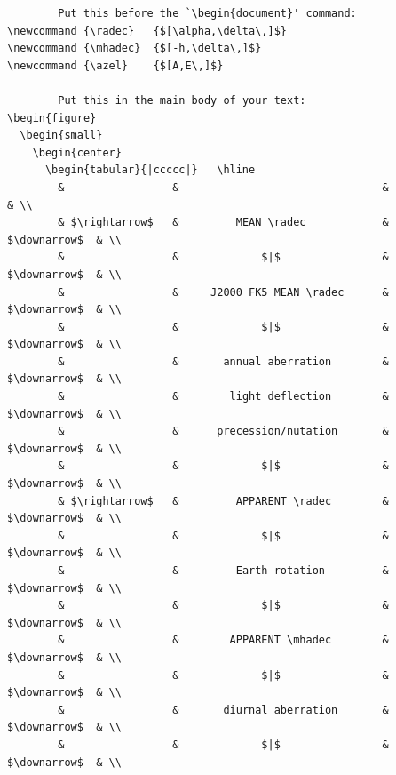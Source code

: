 \documentclass[twoside,11pt]{article}
\renewcommand{\_}{\texttt{\symbol{95}}}
\newcommand {\radec}   {$[\alpha,\delta\,]$}
\newcommand {\mhadec}  {$[-h,\delta\,]$}
\newcommand {\azel}    {$[A,E\,]$}
\begin{document}
{\scriptsize
\begin{verbatim}
        Put this before the `\begin{document}' command:
\newcommand {\radec}   {$[\alpha,\delta\,]$}
\newcommand {\mhadec}  {$[-h,\delta\,]$}
\newcommand {\azel}    {$[A,E\,]$}

        Put this in the main body of your text:
\begin{figure}
  \begin{small}
    \begin{center}
      \begin{tabular}{|ccccc|}   \hline
        &                 &                                &                & \\
        & $\rightarrow$   &         MEAN \radec            &  $\downarrow$  & \\
        &                 &             $|$                &  $\downarrow$  & \\
        &                 &     J2000 FK5 MEAN \radec      &  $\downarrow$  & \\
        &                 &             $|$                &  $\downarrow$  & \\
        &                 &       annual aberration        &  $\downarrow$  & \\
        &                 &        light deflection        &  $\downarrow$  & \\
        &                 &      precession/nutation       &  $\downarrow$  & \\
        &                 &             $|$                &  $\downarrow$  & \\
        & $\rightarrow$   &         APPARENT \radec        &  $\downarrow$  & \\
        &                 &             $|$                &  $\downarrow$  & \\
        &                 &         Earth rotation         &  $\downarrow$  & \\
        &                 &             $|$                &  $\downarrow$  & \\
        &                 &        APPARENT \mhadec        &  $\downarrow$  & \\
        &                 &             $|$                &  $\downarrow$  & \\
        &                 &       diurnal aberration       &  $\downarrow$  & \\
        &                 &             $|$                &  $\downarrow$  & \\

\end{verbatim}}
\end{document}
